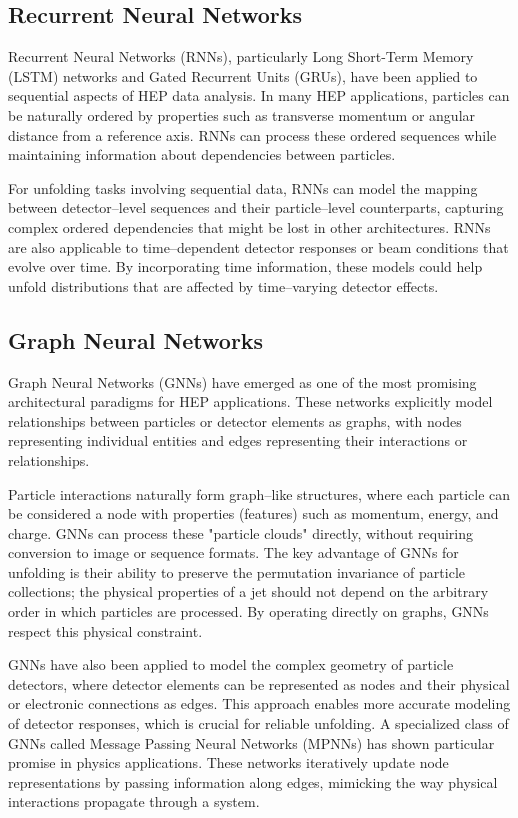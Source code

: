 \subsection{Recurrent Neural Networks}
    Recurrent Neural Networks (RNNs), particularly Long Short-Term Memory (LSTM) networks and Gated Recurrent Units (GRUs), have been applied to sequential aspects of HEP data analysis.
    In many HEP applications, particles can be naturally ordered by properties such as transverse momentum or angular distance from a reference axis.
    RNNs can process these ordered sequences while maintaining information about dependencies between particles.

    For unfolding tasks involving sequential data, RNNs can model the mapping between detector--level sequences and their particle--level counterparts, capturing complex ordered dependencies that might be lost in other architectures.
    RNNs are also applicable to time--dependent detector responses or beam conditions that evolve over time.
    By incorporating time information, these models could help unfold distributions that are affected by time--varying detector effects.
\subsection{Graph Neural Networks}
    Graph Neural Networks (GNNs) have emerged as one of the most promising architectural paradigms for HEP applications.
    These networks explicitly model relationships between particles or detector elements as graphs, with nodes representing individual entities and edges representing their interactions or relationships.

    Particle interactions naturally form graph--like structures, where each particle can be considered a node with properties (features) such as momentum, energy, and charge.
    GNNs can process these "particle clouds" directly, without requiring conversion to image or sequence formats.
    The key advantage of GNNs for unfolding is their ability to preserve the permutation invariance of particle collections;
    the physical properties of a jet should not depend on the arbitrary order in which particles are processed.
    By operating directly on graphs, GNNs respect this physical constraint.

    GNNs have also been applied to model the complex geometry of particle detectors, where detector elements can be represented as nodes and their physical or electronic connections as edges.\kd{}
    This approach enables more accurate modeling of detector responses, which is crucial for reliable unfolding.
    A specialized class of GNNs called Message Passing Neural Networks (MPNNs) has shown particular promise in physics applications.\kd{}
    These networks iteratively update node representations by passing information along edges, mimicking the way physical interactions propagate through a system.
